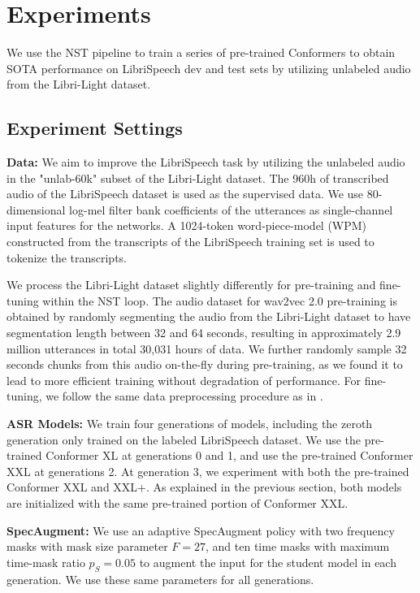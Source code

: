 \documentclass[dvipsnames]{article}
\begin{document}
\section{Experiments}

We use the NST pipeline to train a series of pre-trained Conformers to obtain SOTA performance on LibriSpeech dev and test sets by utilizing unlabeled audio from the Libri-Light dataset.

\subsection{Experiment Settings}

\textbf{Data:} We aim to improve the LibriSpeech task \cite{librispeech} by utilizing the unlabeled audio in the "unlab-60k" subset of the Libri-Light \cite{librilight} dataset. The 960h of transcribed audio of the LibriSpeech dataset is used as the supervised data. We use 80-dimensional log-mel filter bank coefficients of the utterances as single-channel input features for the networks. A 1024-token word-piece-model (WPM) \cite{wpm} constructed from the transcripts of the LibriSpeech training set is used to tokenize the transcripts.

We process the Libri-Light dataset slightly differently for pre-training and fine-tuning within the NST loop. The audio dataset for wav2vec 2.0 pre-training is obtained by randomly segmenting the audio from the Libri-Light dataset to have segmentation length between 32 and 64 seconds, resulting in approximately 2.9 million utterances in total 30,031 hours of data. We further randomly sample 32 seconds chunks from this audio on-the-fly during pre-training, as we found it to lead to more efficient training without degradation of performance. For fine-tuning, we follow the same data preprocessing procedure as in \cite{nstasr}.  
\smallskip

\textbf{ASR Models:} We train four generations of models, including the zeroth generation only trained on the labeled LibriSpeech dataset. We use the pre-trained Conformer XL at generations 0 and 1, and use the pre-trained Conformer XXL at generations 2. At generation 3, we experiment with both the pre-trained Conformer XXL and XXL+. As explained in the previous section, both models are initialized with the same pre-trained portion of Conformer XXL.
\smallskip

\textbf{SpecAugment:} We use an adaptive SpecAugment \cite{specaugment, specaugment2} policy with two frequency masks with mask size parameter $F = 27$, and ten time masks with maximum time-mask ratio $p_S = 0.05$ to augment the input for the student model in each generation. We use these same parameters for all generations.
\smallskip
\end{document}
